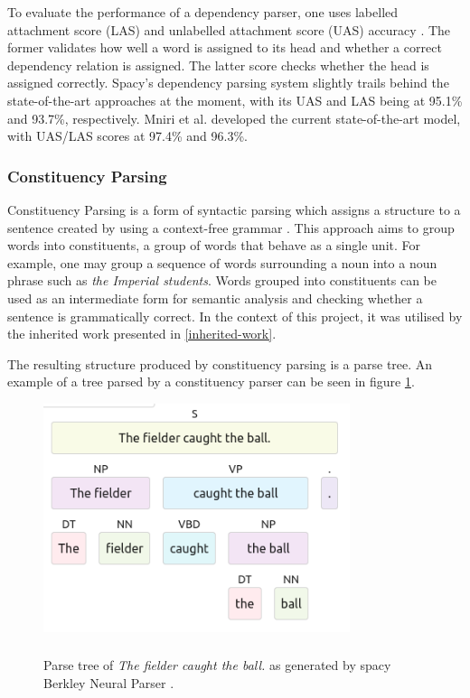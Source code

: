 
To evaluate the performance of a dependency parser, one uses labelled attachment score (LAS) and unlabelled attachment score (UAS) accuracy \cite{RefWorks:RefID:28-jurafsky2014speech}.
The former validates how well a word is assigned to its head and whether a correct dependency relation is assigned.
The latter score checks whether the head is assigned correctly.
Spacy's dependency parsing system slightly trails behind the state-of-the-art approaches at the moment, with its UAS and LAS being at 95.1\% and 93.7\%, respectively. 
Mniri et al. \cite{RefWorks:RefID:29-mrini2019rethinking} developed the current state-of-the-art model, with UAS/LAS scores at 97.4\% and 96.3\%.

\subsubsection{Constituency Parsing}

Constituency Parsing is a form of syntactic parsing which assigns a structure to a sentence created by using a context-free grammar \cite{RefWorks:RefID:28-jurafsky2014speech}.
This approach aims to group words into constituents, a group of words that behave as a single unit.
For example, one may group a sequence of words surrounding a noun into a noun phrase such as \emph{the Imperial students}.
Words grouped into constituents can be used as an intermediate form for semantic analysis and checking whether a sentence is grammatically correct.
In the context of this project, it was utilised by the inherited work presented in \ref{inherited-work}.


The resulting structure produced by constituency parsing is a parse tree. 
An example of a tree parsed by a constituency parser can be seen in figure \ref{constituency-graph}.

\begin{figure}[h]
\caption{Parse tree of \emph{The fielder caught the ball.} as generated by spacy Berkley Neural Parser \cite{RefWorks:RefID:26-spacy}.}
\centering
\includegraphics[width=0.8\textwidth]{background/constituency parse.png}
\label{constituency-graph}
\end{figure}

